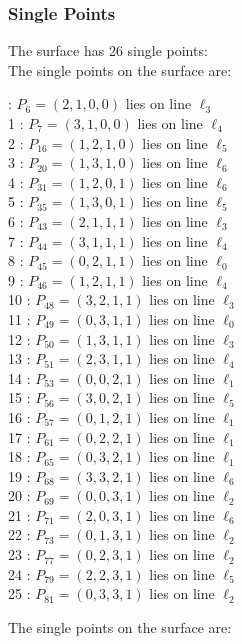\documentclass{article}
\begin{document}
{\subsubsection*{Single Points}
The surface has 26 single points:\\
The single points on the surface are:\\
\begin{multicols}{2}
 : $P_{6}=( 2, 1, 0, 0 )$ lies on line $\ell_{3}$\\
1 : $P_{7}=( 3, 1, 0, 0 )$ lies on line $\ell_{4}$\\
2 : $P_{16}=( 1, 2, 1, 0 )$ lies on line $\ell_{5}$\\
3 : $P_{20}=( 1, 3, 1, 0 )$ lies on line $\ell_{6}$\\
4 : $P_{31}=( 1, 2, 0, 1 )$ lies on line $\ell_{6}$\\
5 : $P_{35}=( 1, 3, 0, 1 )$ lies on line $\ell_{5}$\\
6 : $P_{43}=( 2, 1, 1, 1 )$ lies on line $\ell_{3}$\\
7 : $P_{44}=( 3, 1, 1, 1 )$ lies on line $\ell_{4}$\\
8 : $P_{45}=( 0, 2, 1, 1 )$ lies on line $\ell_{0}$\\
9 : $P_{46}=( 1, 2, 1, 1 )$ lies on line $\ell_{4}$\\
10 : $P_{48}=( 3, 2, 1, 1 )$ lies on line $\ell_{3}$\\
11 : $P_{49}=( 0, 3, 1, 1 )$ lies on line $\ell_{0}$\\
12 : $P_{50}=( 1, 3, 1, 1 )$ lies on line $\ell_{3}$\\
13 : $P_{51}=( 2, 3, 1, 1 )$ lies on line $\ell_{4}$\\
14 : $P_{53}=( 0, 0, 2, 1 )$ lies on line $\ell_{1}$\\
15 : $P_{56}=( 3, 0, 2, 1 )$ lies on line $\ell_{5}$\\
16 : $P_{57}=( 0, 1, 2, 1 )$ lies on line $\ell_{1}$\\
17 : $P_{61}=( 0, 2, 2, 1 )$ lies on line $\ell_{1}$\\
18 : $P_{65}=( 0, 3, 2, 1 )$ lies on line $\ell_{1}$\\
19 : $P_{68}=( 3, 3, 2, 1 )$ lies on line $\ell_{6}$\\
20 : $P_{69}=( 0, 0, 3, 1 )$ lies on line $\ell_{2}$\\
21 : $P_{71}=( 2, 0, 3, 1 )$ lies on line $\ell_{6}$\\
22 : $P_{73}=( 0, 1, 3, 1 )$ lies on line $\ell_{2}$\\
23 : $P_{77}=( 0, 2, 3, 1 )$ lies on line $\ell_{2}$\\
24 : $P_{79}=( 2, 2, 3, 1 )$ lies on line $\ell_{5}$\\
25 : $P_{81}=( 0, 3, 3, 1 )$ lies on line $\ell_{2}$\\
\end{multicols}
The single points on the surface are:\\
}
\end{document}
